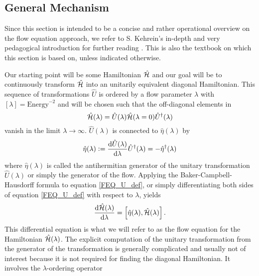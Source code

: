 \subsection{General Mechanism}\label{General Mechanism}
Since this section is intended to be a concise and rather operational overview on the flow equation approach, we refer to S. Kehrein's in-depth and very pedagogical introduction for further reading \cite{kehrein2006flow}. This is also the textbook on which this section is based on, unless indicated otherwise.\par 
Our starting point will be some Hamiltonian $\hat{\mathcal{H}}$ and our goal will be to continuously transform $\hat{\mathcal{H}}$ into an unitarily equivalent diagonal Hamiltonian. This sequence of transformations $\hat U$ is ordered by a flow parameter $\lambda$ with $\left[\lambda\right]=\mathrm{Energy}^{-2}$ and will be chosen such that the off-diagonal elements in  
\begin{equation}\label{FEQ_U_def}
\hat{\mathcal{H}}(\lambda)=\hat U(\lambda)\hat{\mathcal{H}} (\lambda = 0)\hat U^\dagger (\lambda)
\end{equation}
vanish in the limit $\lambda\rightarrow\infty$. $\hat U(\lambda)$ is connected to $\hat\eta(\lambda)$ by
\begin{equation}
\hat\eta(\lambda)\defeq\frac{\mathrm d\hat U(\lambda)}{\mathrm d\lambda}\hat U^\dagger(\lambda)=-\hat\eta^\dagger(\lambda)%
\end{equation}
where $\hat\eta(\lambda)$ is called the antihermitian generator of the unitary transformation $\hat U(\lambda)$ or simply the generator of the flow. Applying the Baker-Campbell-Hausdorff formula to equation \ref{FEQ_U_def}, or simply differentiating both sides of equation \ref{FEQ_U_def} with respect to $\lambda$, yields
\begin{equation}\label{FEQ_ODE_def}
\frac{\mathrm d\hat{\mathcal{H}}(\lambda)}{\mathrm d\lambda} = \left[\hat\eta(\lambda),\hat{\mathcal{H}}(\lambda)\right].
\end{equation}
This differential equation is what we will refer to as the flow equation for the Hamiltonian $\hat{\mathcal{H}} (\lambda)$. 
The explicit computation of the unitary transformation from the generator of the transformation is generally complicated and usually not of interest because it is not required for finding the diagonal Hamiltonian. It involves the $\lambda$-ordering operator 

